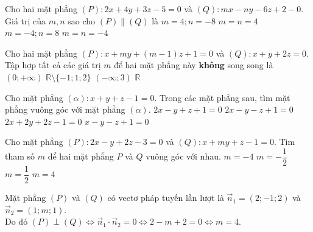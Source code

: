 \begin{ex}%
	Cho hai mặt phẳng $(P) \colon 2x+4y+3z-5=0$ và $(Q) \colon mx-ny-6z+2-0$. Giá trị của $m,n$ sao cho $(P) \parallel (Q)$ là
	\choice
	{$m=4;n=-8$}
	{$m=n=4$}
	{\True $m=-4;n=8$}
	{$m=n=-4$}
	
\end{ex}

\begin{ex}
	Cho hai mặt phẳng $(P)\colon x+my+(m-1)z+1=0$ và $(Q)\colon x+y+2z=0$. Tập hợp tất cả các giá trị $m$ để hai mặt phẳng này \textbf{không} song song là
	\choice
	{$(0;+\infty)$}
	{$\mathbb{R}\setminus\{-1;1;2\}$}
	{$(-\infty;3)$}
	{\True $\mathbb{R}$}
\end{ex}

\begin{ex}
	Cho mặt phẳng $(\alpha)\colon x+y+z-1=0$. Trong các mặt phẳng sau, tìm mặt phẳng vuông góc với mặt phẳng $(\alpha)$.
	\choice
	{$2x-y+z+1=0$}
	{\True $2x-y-z+1=0$}
	{$2x+2y+2z-1=0$}
	{$x-y-z+1=0$}
\end{ex}

\begin{ex}%
	Cho mặt phẳng $(P)\colon 2x-y+2z-3=0$ và $(Q) \colon x+my+z-1=0$. Tìm tham số $m$ để hai mặt phẳng $P$ và $Q$ vuông góc với nhau.
	\choice
	{$m=-4$}
	{$m=- \dfrac{1}{2}$}
	{$m=\dfrac{1}{2}$}
	{\True $m=4$}
	\loigiai
	{ Mặt phẳng $(P)$ và $(Q)$ có vectơ pháp tuyến lần lượt là $\overrightarrow{n}_1=(2;-1;2)$ và $\overrightarrow{n}_2=(1;m;1)$. \\
		Do đó $(P) \perp (Q) \Leftrightarrow \overrightarrow{n}_1 \cdot \overrightarrow{n}_2=0 \Leftrightarrow 2-m+2=0 \Leftrightarrow m=4$.
		
	}
\end{ex}

